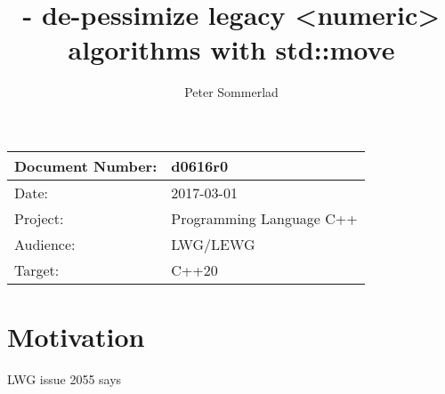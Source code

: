 \documentclass[ebook,11pt,article]{memoir}
\title{\papernumber{} - de-pessimize legacy {<numeric>} algorithms with std::move}
\author{Peter Sommerlad}
\date{\paperdate}                        %
\newcommand{\papernumber}{d0616r0}
\newcommand{\paperdate}{2017-03-01}
\begin{document}
\maketitle
\begin{tabular}[t]{|l|l|}\hline 
Document Number:& \papernumber  \\\hline
Date: & \paperdate \\\hline
Project: & Programming Language C++\\\hline 
Audience: & LWG/LEWG\\\hline
Target: & C++20\\\hline
\end{tabular}

\chapter{Motivation}
LWG issue 2055 says
\end{document}
